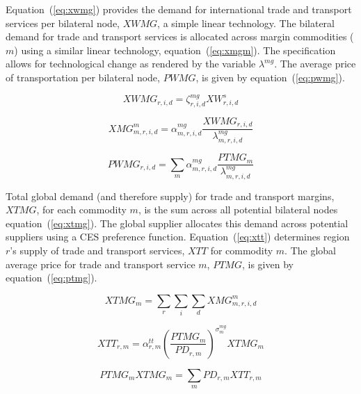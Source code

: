 \documentclass[11pt,letterpaper]{report}
\begin{document}
Equation~(\ref{eq:xwmg}) provides the demand for international trade and
transport services per bilateral node, $\mathit{XWMG}$, a simple linear
technology. The bilateral demand for trade and transport services is allocated
across margin commodities ($m$) using a similar linear technology,
equation~(\ref{eq:xmgm}). The specification allows for technological change as
rendered by the variable $\lambda^{\mathit{mg}}$. The average price of
transportation per bilateral node, $\mathit{PWMG}$, is given by
equation~(\ref{eq:pwmg}).

\begin{equation}
\label{eq:xwmg}
\mathit{XWMG}_{r,i,d} = \zeta^{\mathit{mg}}_{r,i,d} \mathit{XW}^s_{r,i,d}
\end{equation}

\begin{equation}
\label{eq:xmgm}
\mathit{XMG}^m_{m,r,i,d} =
   \alpha^{\mathit{mg}}_{m,r,i,d}
   \frac{\mathit{XWMG}_{r,i,d}} {\lambda^{\mathit{mg}}_{m,r,i,d}}
\end{equation}

\begin{equation}
\label{eq:pwmg}
\mathit{PWMG}_{r,i,d} =
   \sum_m{
      \alpha^{\mathit{mg}}_{m,r,i,d}
      \frac {\mathit{PTMG}_{m}} {\lambda^{\mathit{mg}}_{m,r,i,d}}
   }
\end{equation}

Total global demand (and therefore supply) for trade and transport margins,
$\mathit{XTMG}$, for each commodity $m$, is the sum across all potential
bilateral nodes equation~(\ref{eq:xtmg}). The global supplier allocates this
demand across potential suppliers using a CES preference function.
Equation~(\ref{eq:xtt}) determines region $r$'s supply of trade and transport
services, $\mathit{XTT}$ for commodity $m$. The global average price for trade
and transport service $m$, $\mathit{PTMG}$, is given by
equation~(\ref{eq:ptmg}).

\begin{equation}
\label{eq:xtmg}
\mathit{XTMG}_{m}  = \sum_r{ \sum_i{ \sum_d{\mathit{XMG}^m_{m,r,i,d}} } }
\end{equation}

\begin{equation}
\label{eq:xtt}
\mathit{XTT}_{r,m} = \alpha^{\mathit{tt}}_{r,m}
   \left( \frac {\mathit{PTMG}_{m}} {\mathit{PD}_{r,m}}
   \right)^{\sigma^{\mathit{mg}}_m}
   \mathit{XTMG}_{m}
\end{equation}

\begin{equation}
\label{eq:ptmg}
\mathit{PTMG}_{m} \mathit{XTMG}_{m} =
   \sum_m{
      \mathit{PD}_{r,m} \mathit{XTT}_{r,m}
   }
\end{equation}
\end{document}
